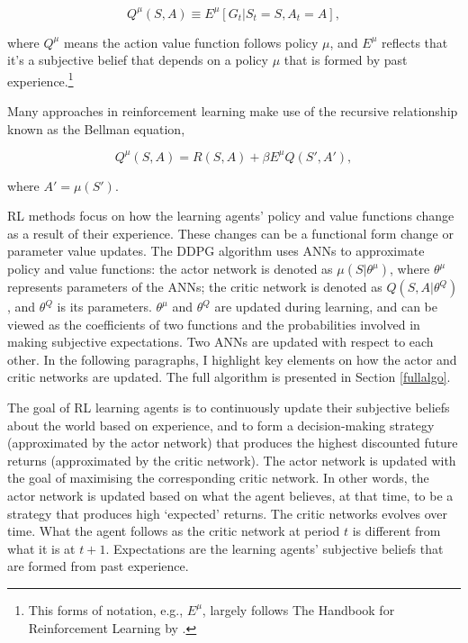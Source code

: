 \documentclass[hidelinks]{article}
\begin{document}
\begin{equation}
	Q^{\mu}(S,A) \equiv E^\mu [G_t|S_t = S, A_t = A],
\end{equation}

where $Q^\mu$ means the action value function follows policy $\mu$, and $E^\mu$ reflects that it's a subjective belief that depends on a policy $\mu$ that is formed by past experience.\footnote{This forms of notation, e.g., $E^\mu$, largely follows The Handbook for Reinforcement Learning by \cite{SB2018}.}

Many approaches in reinforcement learning make use of the recursive relationship known as the Bellman equation,

\begin{equation}
	Q^{\mu}(S,A) = R(S, A) + \beta E^\mu Q(S', A'),
\end{equation}

where $A' = \mu(S')$.

RL methods focus on how the learning agents' policy and value functions change as a result of their experience. These changes can be a functional form change or parameter value updates. The DDPG algorithm uses ANNs to approximate policy and value functions: the actor network is denoted as $\mu(S|\theta^\mu)$, where $\theta^\mu$ represents parameters of the ANNs; the critic network is denoted as $Q(S, A|\theta^Q)$, and $\theta^Q$ is its parameters. $\theta^\mu$ and $\theta^Q$ are updated during learning, and can be viewed as the coefficients of two functions and the probabilities involved in making subjective expectations. Two ANNs are updated with respect to each other. In the following paragraphs, I highlight key elements on how the actor and critic networks are updated. The full algorithm is presented in Section \ref{fullalgo}.

The goal of RL learning agents is to continuously update their subjective beliefs about the world based on experience, and to form a decision-making strategy (approximated by the actor network) that produces the highest discounted future returns (approximated by the critic network). The actor network is updated with the goal of maximising the corresponding critic network. In other words, the actor network is updated based on what the agent believes, at that time, to be a strategy that produces high `expected' returns. The critic networks evolves over time. What the agent follows as the critic network at period $t$ is different from what it is at $t+1$. Expectations are the learning agents' subjective beliefs that are formed from past experience. 
\end{document}
